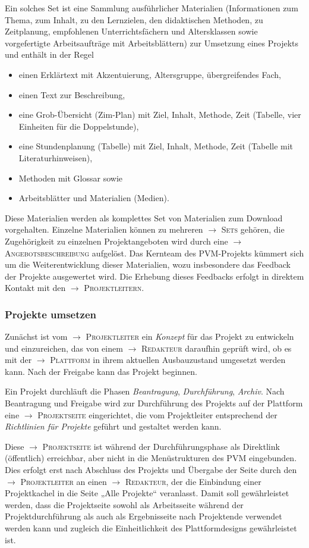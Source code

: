 \documentclass[a4paper,11pt]{article}
\newcommand{\glossar}[1]{{$\to$ \textsc{#1}}}
\begin{document}
Ein solches Set ist eine Sammlung ausführlicher Materialien (Informationen zum
Thema, zum Inhalt, zu den Lernzielen, den didaktischen Methoden, zu
Zeitplanung, empfohlenen Unterrichtsfächern und Altersklassen sowie
vorgefertigte Arbeitsaufträge mit Arbeitsblättern) zur Umsetzung eines
Projekts und enthält in der Regel
\begin{itemize}\itemsep0pt
\item einen Erklärtext mit Akzentuierung, Altersgruppe, übergreifendes Fach,
\item einen Text zur Beschreibung,
\item eine Grob-Übersicht (Zim-Plan) mit Ziel, Inhalt, Methode, Zeit (Tabelle,
  vier Einheiten für die Doppelstunde),
\item eine Stundenplanung (Tabelle) mit Ziel, Inhalt, Methode, Zeit (Tabelle
  mit Literaturhinweisen),
\item Methoden mit Glossar sowie 
\item Arbeitsblätter und Materialien (Medien).
\end{itemize}
Diese Materialien werden als komplettes Set von Materialien zum Download
vorgehalten.  Einzelne Materialien können zu mehreren \glossar{Sets} gehören,
die Zugehörigkeit zu einzelnen Projektangeboten wird durch eine
\glossar{Angebotsbeschreibung} aufgelöst.  Das Kernteam des PVM-Projekts
kümmert sich um die Weiterentwicklung dieser Materialien, wozu insbesondere
das Feedback der Projekte ausgewertet wird.  Die Erhebung dieses Feedbacks
erfolgt in direktem Kontakt mit den \glossar{Projektleitern}.

\subsubsection{Projekte umsetzen}

Zunächst ist vom \glossar{Projektleiter} ein \emph{Konzept} für das Projekt zu
entwickeln und einzureichen, das von einem \glossar{Redakteur} daraufhin
geprüft wird, ob es mit der \glossar{Plattform} in ihrem aktuellen
Ausbauzustand umgesetzt werden kann. Nach der Freigabe kann das Projekt
beginnen. 

Ein Projekt durchläuft die Phasen \emph{Beantragung}, \emph{Durchführung},
\emph{Archiv}.  Nach Beantragung und Freigabe wird zur Durchführung des
Projekts auf der Plattform eine \glossar{Projektseite} eingerichtet, die vom
Projektleiter entsprechend der \emph{Richtlinien für Projekte} geführt und
gestaltet werden kann.

Diese \glossar{Projektseite} ist während der Durchführungsphase als Direktlink
(öffentlich) erreichbar, aber nicht in die Menüstrukturen des PVM eingebunden.
Dies erfolgt erst nach Abschluss des Projekts und Übergabe der Seite durch den
\glossar{Projektleiter} an einen \glossar{Redakteur}, der die Einbindung einer
Projektkachel in die Seite „Alle Projekte“ veranlasst.  Damit soll
gewährleistet werden, dass die Projektseite sowohl als Arbeitsseite während der
Projektdurchführung als auch als Ergebnisseite nach Projektende verwendet
werden kann und zugleich die Einheitlichkeit des Plattformdesigns gewährleistet
ist.
\end{document}

